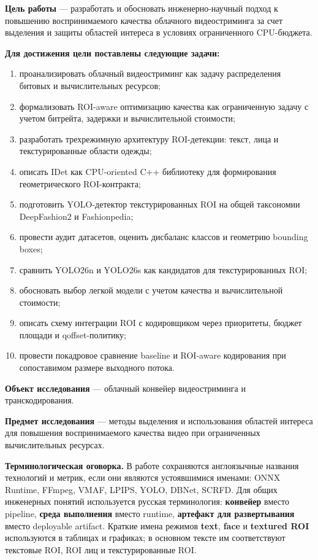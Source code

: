 \documentclass[12pt,a4paper,oneside,openany]{report}
\newcommand{\important}[1]{\textbf{#1}}
\begin{document}
\important{Цель работы} --- разработать и обосновать инженерно-научный подход к повышению
воспринимаемого качества облачного видеостриминга за счет выделения и защиты областей интереса в
условиях ограниченного CPU-бюджета.

\vspace{0.5em}

\noindent\important{Для достижения цели поставлены следующие задачи:}
\begin{enumerate}[label=\arabic*)]
  \item проанализировать облачный видеостриминг как задачу распределения битовых и вычислительных
      ресурсов;
  \item формализовать ROI-aware оптимизацию качества как ограниченную задачу с учетом битрейта,
      задержки и вычислительной стоимости;
  \item разработать трехрежимную архитектуру ROI-детекции: текст, лица и текстурированные области
      одежды;
  \item описать IDet как CPU-oriented C++ библиотеку для формирования геометрического
      ROI-контракта;
  \item подготовить YOLO-детектор текстурированных ROI на общей таксономии DeepFashion2 и
      Fashionpedia;
  \item провести аудит датасетов, оценить дисбаланс классов и геометрию bounding boxes;
  \item сравнить YOLO26n и YOLO26s как кандидатов для текстурированных ROI;
  \item обосновать выбор легкой модели с учетом качества и вычислительной стоимости;
  \item описать схему интеграции ROI с кодировщиком через приоритеты, бюджет площади и
      qoffset-политику;
  \item провести покадровое сравнение baseline и ROI-aware кодирования при сопоставимом размере
      выходного потока.
\end{enumerate}

\important{Объект исследования} --- облачный конвейер видеостриминга и транскодирования.

\important{Предмет исследования} --- методы выделения и использования областей интереса для
повышения воспринимаемого качества видео при ограниченных вычислительных ресурсах.

\important{Терминологическая оговорка.} В работе сохраняются англоязычные названия технологий и
метрик, если они являются устоявшимися именами: ONNX Runtime, FFmpeg, VMAF, LPIPS, YOLO, DBNet,
SCRFD. Для общих инженерных понятий используется русская терминология: \important{конвейер}
вместо pipeline, \important{среда выполнения} вместо runtime, \important{артефакт для
развертывания} вместо deployable artifact. Краткие имена режимов \important{text},
\important{face} и \important{textured ROI} используются в таблицах и графиках; в основном
тексте им соответствуют текстовые ROI, ROI лиц и текстурированные ROI.
\end{document}
